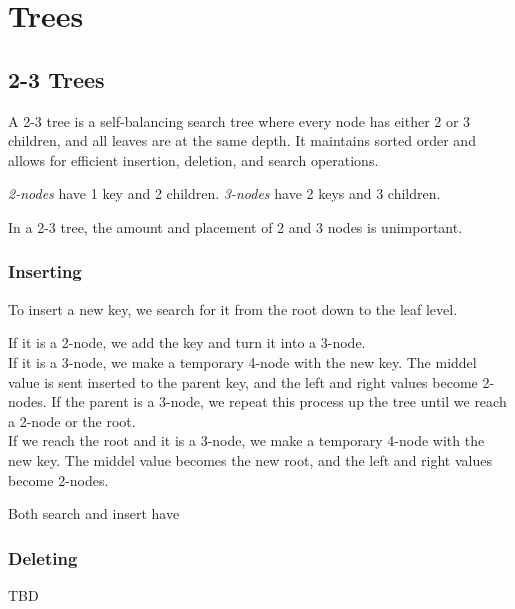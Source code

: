\section{Trees}

\subsection{2-3 Trees}
A 2-3 tree is a self-balancing search tree where every node has either 2 or 3 children, and all leaves are at the same depth. It maintains sorted order and allows for efficient insertion, deletion, and search operations.

\emph{2-nodes} have 1 key and 2 children. \emph{3-nodes} have 2 keys and 3 children.

In a 2-3 tree, the amount and placement of 2 and 3 nodes is unimportant.

\subsubsection{Inserting}
To insert a new key, we search for it from the root down to the leaf level.

If it is a 2-node, we add the key and turn it into a 3-node. \\
If it is a 3-node, we make a temporary 4-node with the new key. The middel value is sent inserted to the parent key, and the left and right values become 2-nodes. If the parent is a 3-node, we repeat this process up the tree until we reach a 2-node or the root. \\
If we reach the root and it is a 3-node, we make a temporary 4-node with the new key. The middel value becomes the new root, and the left and right values become 2-nodes.

Both search and insert have 

\subsubsection{Deleting}
TBD